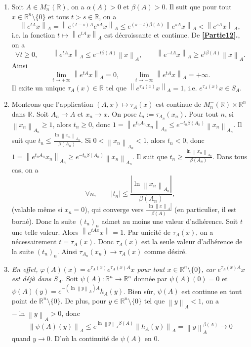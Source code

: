 \documentclass[french]{article}
\theoremstyle{definition}
\newcommand{\abs}[1]{\left|#1\right|}
\newcommand{\norm}[1]{\left\|#1\right\|}
\newcommand{\Rbb}{\mathbb{R}}
\begin{document}
\begin{enumerate}
    
    \item  \label{Partie13} Soit $A \in M_n^{-}(\Rbb)$, on a $\alpha(A) > 0$ et $\beta(A) > 0$. Il suit que pour tout $x \in \Rbb^{n} \setminus \{0\}$ et tous $t > s \in \Rbb$, on a
        $$\norm{e^{tA}x}_A = \norm{e^{(t-s)A}e^{sA}x}_A \le e^{(s-t)\beta(A)}\norm{e^{sA}x}_A < \norm{e^{sA}x}_A,$$
    i.e. la fonction $t \mapsto \norm{e^{tA}x}_A$ est d\'ecroissante et continue. De {\bf \ref{Partie12}.}, on a
        $$\forall t \ge  0, \qquad \norm{e^{tA}x}_A \le e^{-t\beta(A)}\norm{x}_A, \qquad \norm{e^{-tA}x}_A \ge e^{t\beta(A)}\norm{x}_A.$$
    Ainsi
        $$\lim_{t \to + \infty} \norm{e^{tA}x}_A = 0, \qquad \lim_{t \to -\infty} \norm{e^{tA}x}_A = +\infty.$$
    Il exite un unique $\tau_A(x) \in \Rbb$ tel que $\norm{e^{\tau_A(x)}x}_A = 1$, i.e. $e^{\tau_A(x)}x \in S_A$.
    
    \item \label{Partie14} Montrons que l'application $(A,x) \mapsto \tau_A(x)$ est continue de $M_n^-(\Rbb) \times \Rbb^n$ dans $\Rbb$. Soit $A_n \to A$ et $x_n \to x$. On pose $t_n:=\tau_{A_n}(x_n)$. Pour tout $n$, si $\norm{x_n}_{A_n} \ge 1$, alors $t_n \ge 0$, donc $1 = \norm{e^{t_nA_n}x_n}_{A_n} \le e^{-t_n\beta(A_n)}\norm{x_n}_{A_n}$. Il suit que $t_n \le \frac{\ln \norm{x_n}_{A_n}}{\beta(A_n)}$. Si $0 < \norm{x_n}_{A_n} < 1$, alors $t_n < 0$, donc $1 = \norm{e^{t_n A_n}x_n}_{A_n} \ge e^{-t_n\beta(A_n)}\norm{x_n}_{A_n}$. Il suit que $t_n \ge \frac{\ln\norm{x_n}_{A_n}}{\beta(A_n)}$. Dans tous cas, on a
        $$\forall n, \qquad |t_n| \le \frac{\abs{\ln\norm{x_n}_{A_n}}}{\beta(A_n)},$$
    (valable m\^eme si $x_n = 0$), qui converge vers $\frac{\abs{\ln\norm{x}_A}}{\beta(A)}$ (en particulier, il est born\'e). Donc la suite $(t_n)_n$ admet au moins une valeur d'adh\'erence. Soit $t$ une telle valeur. Alors $\norm{e^{tAx}x} = 1$. Par unicit\'e de $\tau_A(x)$, on a n\'ecessairement $t = \tau_A(x)$. Donc $\tau_A(x)$ est la seule valeur d'adh\'erence de la suite $(t_n)_n$. Ainsi $\tau_{A_n}(x_n) \to \tau_A(x)$ comme d\'esir\'e.
    
    \item \label{Partie15} {\it En effet, $ \varphi(A)(x) = e^{\tau_A(x)}e^{\tau_A(x)A}x$ pour tout $x \in \Rbb^{n} \setminus \{0\}$, car $e^{\tau_A(x)A}x$ est d\'ej\`a dans $S_A$}. 
    Soit $\psi(A): \Rbb^n \to \Rbb^n$ donn\'ee par $\psi(A)(0) = 0$ et $\psi(A)(y) = e^{-(\ln\norm{y}_A) A}h_A(y)$. Bien s\^ur, $\psi(A)$ est continue en tout point de $\Rbb^n \setminus \{0\}$. De plus, pour $y \in \Rbb^n \setminus \{0\}$ tel que $\norm{y}_A < 1$, on a $-\ln\norm{y}_A > 0$, donc
        $$\norm{\psi(A)(y)}_A \le  e^{\ln\norm{y}_A\beta(A)}\norm{h_A(y)}_A = \norm{y}_A^{\beta(A)} \to 0$$
    quand $y \to 0$. D'o\`u la continuit\'e de $\psi(A)$ en $0$. 
    

\end{enumerate}
\end{document}
